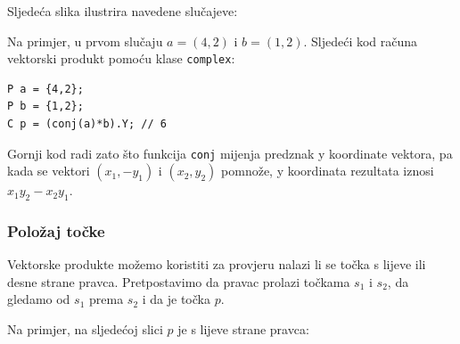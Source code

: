 Sljedeća slika ilustrira navedene slučajeve:
\begin{center}
\end{center}

\noindent
Na primjer, u prvom slučaju
$a=(4,2)$ i $b=(1,2)$.
Sljedeći kod računa vektorski produkt
pomoću klase \texttt{complex}:

\begin{lstlisting}
P a = {4,2};
P b = {1,2};
C p = (conj(a)*b).Y; // 6
\end{lstlisting}

Gornji kod radi zato što
funkcija \texttt{conj} mijenja predznak y koordinate
vektora,
pa kada se vektori $(x_1,-y_1)$ i $(x_2,y_2)$
pomnože, y koordinata
rezultata iznosi $x_1 y_2 - x_2 y_1$.

\subsubsection{Položaj točke}

Vektorske produkte možemo koristiti za provjeru
nalazi li se točka s lijeve ili desne
strane pravca.
Pretpostavimo da pravac prolazi točkama
$s_1$ i $s_2$, da gledamo od $s_1$
prema $s_2$ i da je točka $p$.

Na primjer, na sljedećoj slici
$p$ je s lijeve strane pravca:
\begin{center}
\end{center}

